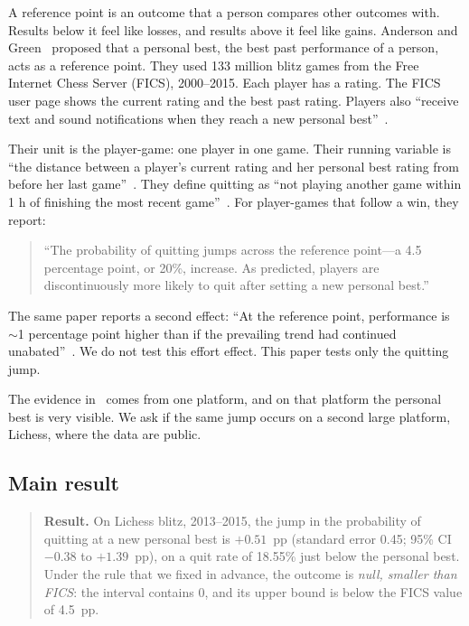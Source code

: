 \documentclass[11pt]{article}
\begin{document}
A reference point is an outcome that a person compares other outcomes with. Results below it feel like losses, and results above it feel like gains. Anderson and Green~\cite{ag} proposed that a personal best, the best past performance of a person, acts as a reference point. They used 133 million blitz games from the Free Internet Chess Server (FICS), 2000--2015. Each player has a rating. The FICS user page shows the current rating and the best past rating. Players also ``receive text and sound notifications when they reach a new personal best''~\cite{ag}.

Their unit is the player-game: one player in one game. Their running variable is ``the distance between a player's current rating and her personal best rating from before her last game''~\cite{ag}. They define quitting as ``not playing another game within 1 h of finishing the most recent game''~\cite{ag}. For player-games that follow a win, they report:

\begin{quote}
``The probability of quitting jumps across the reference point---a 4.5 percentage point, or 20\%, increase. As predicted, players are discontinuously more likely to quit after setting a new personal best.''~\cite{ag}
\end{quote}

The same paper reports a second effect: ``At the reference point, performance is $\sim$1 percentage point higher than if the prevailing trend had continued unabated''~\cite{ag}. We do not test this effort effect. This paper tests only the quitting jump.

The evidence in~\cite{ag} comes from one platform, and on that platform the personal best is very visible. We ask if the same jump occurs on a second large platform, Lichess, where the data are public.

\subsection{Main result}

\begin{quote}
\textbf{Result.} On Lichess blitz, 2013--2015, the jump in the probability of quitting at a new personal best is $+0.51$~pp (standard error 0.45; 95\% CI $-0.38$ to $+1.39$~pp), on a quit rate of 18.55\% just below the personal best. Under the rule that we fixed in advance, the outcome is \emph{null, smaller than FICS}: the interval contains 0, and its upper bound is below the FICS value of 4.5~pp.
\end{quote}
\end{document}
